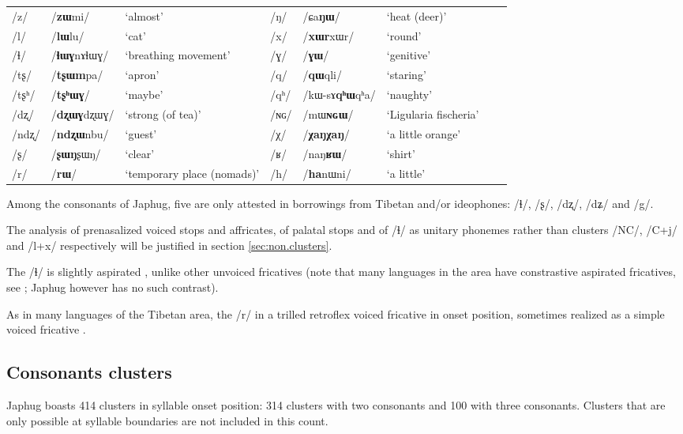 \documentclass[oneside,a4paper,11pt]{article}
\newcommand{\ipa}[1]{\mbox{\phon/#1/}}
\newcommand{\phonet}[1]{\mbox{\phon[#1]}}
\begin{document}
\begin{table}[h]
{\begin{tabular}{lll|lllll}
 \ipa{z} & 	  \ipa{\textbf{zɯ}mi}   & 	 `almost' & \ipa{ŋ} & 	\ipa{ɕa\textbf{ŋɯ}}   & 	 `heat (deer)' \\ 
 \ipa{l} & 	  \ipa{\textbf{lɯ}lu}   & 	 `cat' & \ipa{x} & 	\ipa{\textbf{xɯr}xɯr}   & 	 `round' \\ 
 \ipa{ɬ} & 	  \ipa{\textbf{ɬɯɣ}nɤɬɯɣ}   & 	 `breathing movement' & \ipa{ɣ} & 	\ipa{\textbf{ɣɯ}}   & 	 `genitive' \\ 
 \ipa{tʂ} & 	 \ipa{\textbf{tʂɯm}pa}   & 	 `apron' & \ipa{q} & 	\ipa{\textbf{qɯ}qli}   & 	 `staring' \\ 
 \ipa{tʂʰ} & 	  \ipa{\textbf{tʂʰɯɣ}}   & 	 `maybe' & \ipa{qʰ} & 	\ipa{kɯ-sɤ\textbf{qʰɯ}qʰa}   & 	 `naughty' \\ 
 \ipa{dʐ} & 	\ipa{\textbf{dʐɯɣ}dʐɯɣ}   & 	 `strong (of tea)' & \ipa{ɴɢ} & 	\ipa{mɯ\textbf{ɴɢɯ}}  & 	 `Ligularia fischeria' \\ 
 \ipa{ndʐ} & 	\ipa{\textbf{ndʐɯ}nbu}   & 	 `guest' & \ipa{χ} & 	\ipa{\textbf{χaŋχaŋ}}   & 	 `a little orange' \\ 
 \ipa{ʂ} & 	\ipa{\textbf{ʂɯŋ}ʂɯŋ}   & 	 `clear' & \ipa{ʁ} & 	\ipa{naŋ\textbf{ʁɯ}}   & 	 `shirt' \\ 
 \ipa{r} & 	\ipa{\textbf{rɯ}}   & 	 `temporary place (nomads)' & 	  \ipa{h}&\ipa{\textbf{ha}nɯni} 	 & `a little'	 \\ 
\bottomrule
\end{tabular}}
\end{table}

Among the consonants of Japhug, five are only attested in borrowings from Tibetan and/or ideophones: \ipa{ɬ}, \ipa{ʂ}, \ipa{dʐ}, \ipa{dʑ} and \ipa{g}.

The analysis of prenasalized voiced stops and affricates, of palatal stops and of \ipa{ɬ} as unitary phonemes rather than clusters \ipa{NC}, \ipa{C+j} and \ipa{l+x} respectively will be justified in section \ref{sec:non.clusters}. 

The \ipa{ɬ} is slightly aspirated \phonet{ɬʰ}, unlike other unvoiced fricatives (note that many languages in the area have constrastive aspirated fricatives, see \citealt{jacques11lingua}; Japhug however has no such contrast).


As in many languages of the Tibetan area, the \ipa{r} in a trilled retroflex voiced fricative \phonet{ɽ͡ʐ} in onset position, sometimes realized as a simple voiced fricative \phonet{ʐ}.


  \subsection*{Consonants clusters} \label{sec:clusters}
  Japhug boasts 414 clusters in syllable onset position:  314 clusters with two consonants and 100 with three consonants. Clusters that are only possible at syllable boundaries are not included in this count. 
  
\end{document}
